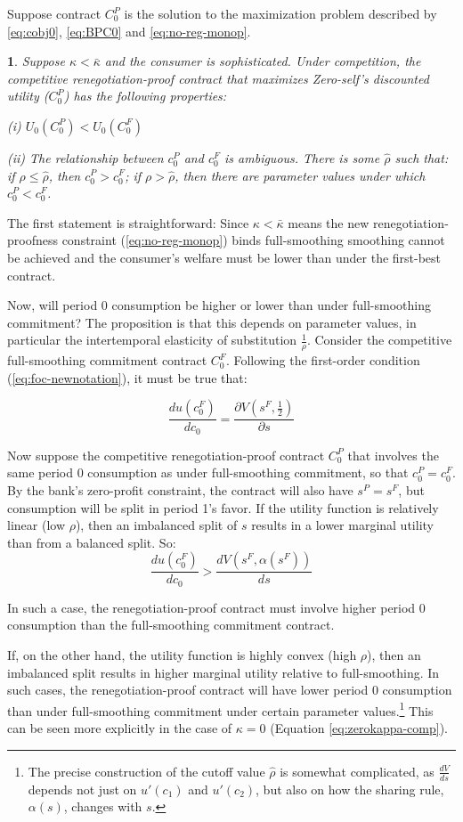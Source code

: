 \documentclass[11pt,english]{article}
\theoremstyle{plain}
\newtheorem{prop}{\protect\propositionname}
\theoremstyle{definition}
\providecommand{\propositionname}{Proposition}
\begin{document}
Suppose contract $C_{0}^{P}$ is the solution to the maximization
problem described by \ref{eq:cobj0}, \ref{eq:BPC0} and \ref{eq:no-reg-monop}.
\begin{prop}
Suppose $\kappa<\bar{\kappa}$ and the consumer is sophisticated.
Under competition, the competitive renegotiation-proof contract that
maximizes Zero-self's discounted utility ($C_{0}^{P}$) has the following
properties:

(i) $U_{0}\left(C_{0}^{P}\right)<U_{0}\left(C_{0}^{F}\right)$

(ii) The relationship between $c_{0}^{P}$ and $c_{0}^{F}$ is ambiguous.
There is some $\hat{\rho}$ such that: if $\rho\leq\hat{\rho}$, then
$c_{0}^{P}>c_{0}^{F}$; if $\rho>\hat{\rho}$, then there are parameter
values under which $c_{0}^{P}<c_{0}^{F}$. 
\end{prop}
The first statement is straightforward: Since $\kappa<\bar{\kappa}$
means the new renegotiation-proofness constraint (\ref{eq:no-reg-monop})
binds full-smoothing smoothing cannot be achieved and the consumer's
welfare must be lower than under the first-best contract.

Now, will period 0 consumption be higher or lower than under full-smoothing
commitment? The proposition is that this depends on parameter values,
in particular the intertemporal elasticity of substitution $\frac{1}{\rho}$.
Consider the competitive full-smoothing commitment contract $C_{0}^{F}$.
Following the first-order condition (\ref{eq:foc-newnotation}), it
must be true that:

\[
\frac{du\left(c_{0}^{F}\right)}{dc_{0}}=\frac{\partial V\left(s^{F},\frac{1}{2}\right)}{\partial s}
\]

Now suppose the competitive renegotiation-proof contract $C_{0}^{P}$
that involves the same period 0 consumption as under full-smoothing
commitment, so that $c_{0}^{P}=c_{0}^{F}$. By the bank's zero-profit
constraint, the contract will also have $s^{P}=s^{F}$, but consumption
will be split in period 1's favor. If the utility function is relatively
linear (low $\rho$), then an imbalanced split of $s$ results in
a lower marginal utility than from a balanced split. So: 
\[
\frac{du\left(c_{0}^{F}\right)}{dc_{0}}>\frac{dV\left(s^{F},\alpha\left(s^{F}\right)\right)}{ds}
\]

In such a case, the renegotiation-proof contract must involve higher
period 0 consumption than the full-smoothing commitment contract.

If, on the other hand, the utility function is highly convex (high
$\rho$), then an imbalanced split results in higher marginal utility
relative to full-smoothing. In such cases, the renegotiation-proof
contract will have lower period 0 consumption than under full-smoothing
commitment under certain parameter values.\footnote{The precise construction of the cutoff value $\hat{\rho}$ is somewhat
complicated, as $\frac{dV}{ds}$ depends not just on $u'\left(c_{1}\right)$
and $u'\left(c_{2}\right)$, but also on how the sharing rule, $\alpha\left(s\right)$,
changes with $s$.} This can be seen more explicitly in the case of $\kappa=0$ (Equation
\ref{eq:zerokappa-comp}).
\end{document}
